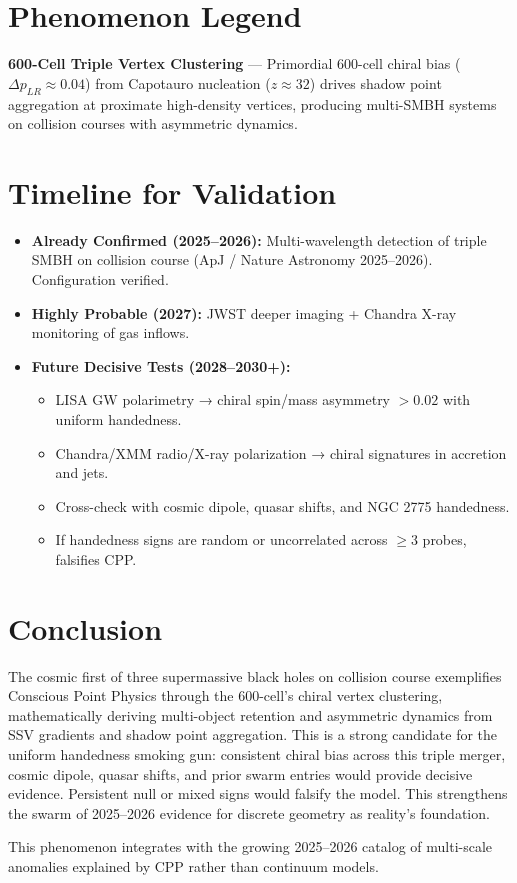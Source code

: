 \documentclass[11pt]{article}
\begin{document}
\section{Phenomenon Legend}
\textbf{600-Cell Triple Vertex Clustering} — Primordial 600-cell chiral bias ($\Delta p_{LR} \approx 0.04$) from Capotauro nucleation ($z \approx 32$) drives shadow point aggregation at proximate high-density vertices, producing multi-SMBH systems on collision courses with asymmetric dynamics.

\section{Timeline for Validation}
\begin{itemize}
    \item \textbf{Already Confirmed (2025--2026):} Multi-wavelength detection of triple SMBH on collision course (ApJ / Nature Astronomy 2025--2026). Configuration verified.
    \item \textbf{Highly Probable (2027):} JWST deeper imaging + Chandra X-ray monitoring of gas inflows.
    \item \textbf{Future Decisive Tests (2028--2030+):}
    \begin{itemize}
        \item LISA GW polarimetry → chiral spin/mass asymmetry $>0.02$ with uniform handedness.
        \item Chandra/XMM radio/X-ray polarization → chiral signatures in accretion and jets.
        \item Cross-check with cosmic dipole, quasar shifts, and NGC 2775 handedness.
        \item If handedness signs are random or uncorrelated across $\geq 3$ probes, falsifies CPP.
    \end{itemize}
\end{itemize}

\section{Conclusion}
The cosmic first of three supermassive black holes on collision course exemplifies Conscious Point Physics through the 600-cell's chiral vertex clustering, mathematically deriving multi-object retention and asymmetric dynamics from SSV gradients and shadow point aggregation. This is a strong candidate for the uniform handedness smoking gun: consistent chiral bias across this triple merger, cosmic dipole, quasar shifts, and prior swarm entries would provide decisive evidence. Persistent null or mixed signs would falsify the model. This strengthens the swarm of 2025--2026 evidence for discrete geometry as reality's foundation.

This phenomenon integrates with the growing 2025--2026 catalog of multi-scale anomalies explained by CPP rather than continuum models.
\end{document}
